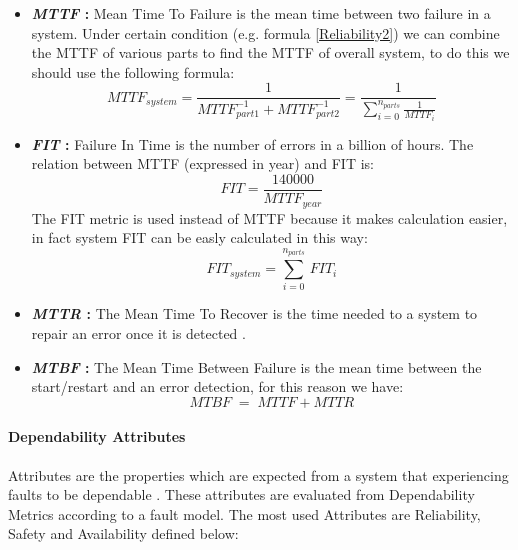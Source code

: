 {{{{\begin{itemize}
					\item \textbf{\textit{MTTF} : } Mean Time To Failure is the mean time between two failure in a system. Under certain condition (e.g. formula \ref{Reliability2}) we can combine the MTTF of various parts to find the MTTF of overall system, to do this we should use the following formula:
					\begin{equation}
						MTTF_{system} = \dfrac{1}{MTTF_{part1}^{-1} + MTTF_{part2}^{-1}} = \dfrac{1}{\sum\limits_{i=0}^{n_{parts}}\frac{1}{MTTF_i}}
					\end{equation} 		
					
					\item \textbf{\textit{FIT} : } Failure In Time is the number of errors in a billion of hours. The relation between MTTF (expressed in year) and FIT is:
					\begin{equation}
					FIT = \dfrac{140000}{MTTF_{year}}
					\end{equation} 
					The FIT metric is used instead of MTTF because it makes calculation easier, in fact system FIT can be easly calculated in this way:
					\begin{equation}
					FIT_{system} = \sum_{i=0}^{n_{parts}}\,FIT_i
					\end{equation}
					
					\item \textbf{\textit{MTTR} : } The Mean Time To Recover is the time needed to a system to repair an error once it is detected  \cite{Mukherjee2008}.
					
					\item \textbf{\textit{MTBF} : } The Mean Time Between Failure is the mean time between the start/restart and an error detection, for this reason we have:
					\begin{equation}
						MTBF\;=\;MTTF+MTTR
					\end{equation}
				\end{itemize} 
			} %
			\paragraph{Dependability Attributes}{
				Attributes are the properties which are expected from a system that experiencing faults to be dependable \cite{Dubrova2013}. These attributes are evaluated from Dependability Metrics according to a fault model. The most used Attributes are Reliability, Safety and Availability defined below: 
				\begin{itemize}
					

\end{itemize}}}}}
